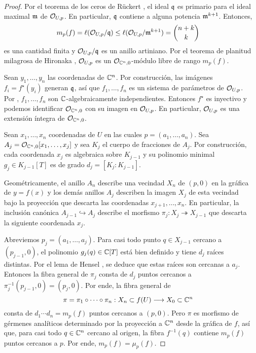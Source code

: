 \begin{proof}
Por el teorema de los ceros de Rückert \cite[pp. 78-80]{ebeling}, el ideal $\mathfrak q$ es primario para el ideal maximal $\mathfrak m$ de $\mathcal O_{U,p}$. En particular, $\mathfrak q$ contiene a alguna potencia $\mathfrak m^{k+1}$. Entonces,
$$m_p(f) = \ell(\mathcal O_{U,p} / \mathfrak q) \le \ell(\mathcal O_{U,p} / \mathfrak m^{k+1}) = \binom {n+k} k$$
es una cantidad finita y $\mathcal O_{U,p} / \mathfrak q$ es un anillo artiniano. Por el teorema de planitud milagrosa de Hironaka \cite[p. 179, teo. 23.1]{matsumura}, $\mathcal O_{U,p}$ es un $\mathcal O_{\mathbb C^n, 0}$-módulo libre de rango $m_p(f)$.

Sean $y_1, \dots, y_n$ las coordenadas de $\mathbb C^n$. Por construcción, las imágenes $f_i = f^\star(y_i)$ generan $\mathfrak q$, así que $f_1, \dots, f_n$ es un sistema de parámetros de $\mathcal O_{U,p}$. Por \cite[p. 123, cor. 11.21]{atiyah}, $f_1, \dots, f_n$ son $\mathbb C$-algebraicamente independientes. Entonces $f^\star$ es inyectivo y podemos identificar $\mathcal O_{\mathbb C^n, 0}$ con su imagen en $\mathcal O_{U,p}$. En particular, $\mathcal O_{U,p}$ es una extensión íntegra de $\mathcal O_{\mathbb C^n, 0}$.

Sean $x_1, \dots, x_n$ coordenadas de $U$ en las cuales $p = (a_1, \dots, a_n)$. Sea $A_j = \mathcal O_{\mathbb C^n, 0}[x_1, \dots, x_j]$ y sea $K_j$ el cuerpo de fracciones de $A_j$. Por construcción, cada coordenada $x_j$ es algebraica sobre $K_{j-1}$ y su polinomio minimal $g_j \in K_{j-1}[T]$ es de grado $d_j = [K_j : K_{j-1}]$.

Geométricamente, el anillo $A_n$ describe una vecindad $X_n$ de $(p,0)$ en la gráfica de $y = f(x)$ y los demás anillos $A_j$ describen la imagen $X_j$ de esta vecindad bajo la proyección que descarta las coordenadas $x_{j+1}, \dots, x_n$. En particular, la inclusión canónica $A_{j-1} \hookrightarrow A_j$ describe el morfismo $\pi_j : X_j \twoheadrightarrow X_{j-1}$ que descarta la siguiente coordenada $x_j$.

Abreviemos $p_j = (a_1, \dots, a_j)$. Para casi todo punto $q \in X_{j-1}$ cercano a $(p_{j-1}, 0)$, el polinomio $g_j(q) \in \mathbb C[T]$ está bien definido y tiene $d_j$ raíces distintas. Por el lema de Hensel \cite[p. 73]{ebeling}, se deduce \cite[p. 101, prop. 2.43]{ebeling} que estas raíces son cercanas a $a_j$. Entonces la fibra general de $\pi_j$ consta de $d_j$ puntos cercanos a $\pi_j^{-1}(p_{j-1}, 0) = (p_j, 0)$. Por ende, la fibra general de
$$\pi = \pi_1 \circ \dots \circ \pi_n : X_n \subset f(U) \longrightarrow X_0 \subset \mathbb C^n$$
consta de $d_1 \cdots d_n = m_p(f)$ puntos cercanos a $(p,0)$. Pero $\pi$ es morfismo de gérmenes analíticos determinado por la proyección a $\mathbb C^n$ desde la gráfica de $f$, así que, para casi todo $q \in \mathbb C^n$ cercano al origen, la fibra $f^{-1}(q)$ contiene $m_p(f)$ puntos cercanos a $p$. Por ende, $m_p(f) = \mu_p(f)$.
\end{proof}

